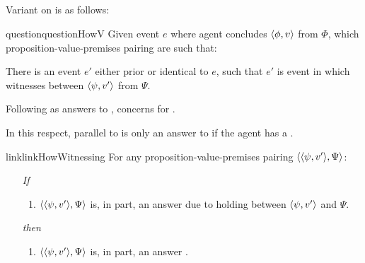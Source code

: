 \subsection{\qHowV{}}
\label{sec:variants-initial:qhowv}

\begin{note}
  Variant on \qHow{} is as follows:

  \begin{restatable}[\qHowV{}]{question}{questionHowV}
    \label{q:how:v}
    Given event \(e\) where agent concludes \(\langle \phi, v \rangle\) from \(\Phi\), which proposition-value-premises pairing are such that:

    There is an event \(e'\) either prior or identical to \(e\), such that \(e'\) is event in which \vAgent{} witnesses \support{} between \(\langle \psi, v' \rangle\) from \(\Psi\).
  \end{restatable}

  Following  as answers to \qWhyVnP{}, \qHowV{} concerns  for .

  In this respect, parallel to \issueInclusion{}
  \ros{} is only an answer to \qWhyVnP{} if the agent has a \witness{}.
\end{note}

\begin{note}
  \begin{restatable}{link}{linkHowWitnessing}
    \label{link:how-witnessing}
    For any proposition-value-premises pairing \(\langle \langle \psi, v' \rangle, \Psi \rangle\):
    \begin{itemize}
    \item[\emph{If}]
      \begin{enumerate}[label=\alph*., ref=(\alph*)]
      \item
        \(\langle \langle \psi, v' \rangle, \Psi \rangle\) is, in part, an answer \qHow{} due to \support{} holding between \(\langle \psi, v' \rangle\) and \(\Psi\).
      \end{enumerate}
    \item[\emph{then}]
      \begin{enumerate}[label=\alph*., ref=(\alph*), resume]
      \item
        \(\langle \langle \psi, v' \rangle, \Psi \rangle\) is, in part, an answer \qHowV{}.
      \end{enumerate}
    \end{itemize}
    \vspace{-\baselineskip}
  \end{restatable}
\end{note}

